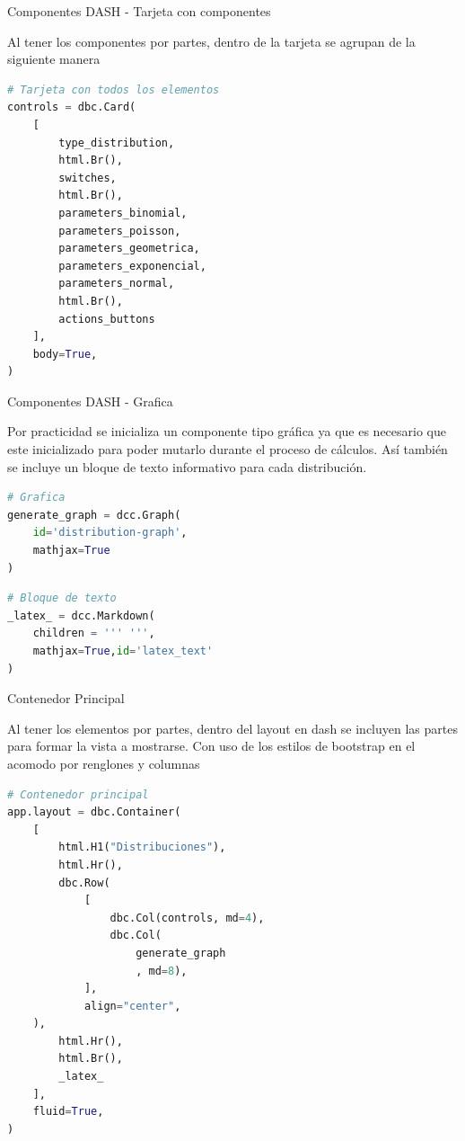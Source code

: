 \documentclass[
	12pt, %
]{fphw}
\begin{document}
{\color{teal}
  \dotfill
  Componentes DASH - Tarjeta con componentes
  \dotfill}

Al tener los componentes por partes, dentro de la tarjeta se agrupan de la siguiente manera

\begin{lstlisting}[language=Python]
# Tarjeta con todos los elementos                                                                          
controls = dbc.Card(
    [
        type_distribution,
        html.Br(),
        switches,
        html.Br(),
        parameters_binomial,
        parameters_poisson,
        parameters_geometrica,
        parameters_exponencial,
        parameters_normal,
        html.Br(),
        actions_buttons
    ],
    body=True,
)
\end{lstlisting}

\newpage
{\color{teal}
  \dotfill
  Componentes DASH - Grafica
  \dotfill}

Por practicidad se inicializa un componente tipo gráfica ya que es necesario que este inicializado para poder mutarlo durante el proceso de cálculos. Así también se incluye un bloque de texto informativo para cada distribución.

\begin{lstlisting}[language=Python]
# Grafica                                                                                                  
generate_graph = dcc.Graph(
    id='distribution-graph',
    mathjax=True
)
\end{lstlisting}

\begin{lstlisting}[language=Python]
# Bloque de texto                                                                                          
_latex_ = dcc.Markdown(
    children = ''' ''',
    mathjax=True,id='latex_text'
)
\end{lstlisting}

{\color{teal}
  \dotfill
   Contenedor Principal
  \dotfill}

Al tener los elementos por partes, dentro del layout en dash se incluyen las partes para formar la vista a mostrarse.
Con uso de los estilos de bootstrap en el acomodo por renglones y columnas

\begin{lstlisting}[language=Python]
# Contenedor principal                                                                                     
app.layout = dbc.Container(
    [
        html.H1("Distribuciones"),
        html.Hr(),
        dbc.Row(
            [
                dbc.Col(controls, md=4),
                dbc.Col(
                    generate_graph
                    , md=8),
            ],
            align="center",
	),
        html.Hr(),
        html.Br(),
        _latex_
    ],
    fluid=True,
)
\end{lstlisting}
\end{document}
